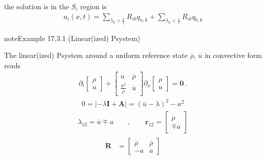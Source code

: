 \documentclass[letterpaper,10pt,english]{jupyterBook}
\begin{document}
\sphinxAtStartPar
the solution is in the \(S_i\) region is
\begin{equation*}
\begin{split}u_i(x,t) = \sum_{\lambda_k > \frac{x}{t}} R_{ik} q_{a,k} +  \sum_{\lambda_k < \frac{x}{t}} R_{ik} q_{b,k}\end{split}
\end{equation*}\label{ch/pde/hyperbolic:example-0}
\begin{sphinxadmonition}{note}{Example 17.3.1 (Linear(ized) P\sphinxhyphen{}system)}



\sphinxAtStartPar
The linear(ized) P\sphinxhyphen{}system around a uniform reference state \(\overline{\rho}\), \(\overline{u}\) in convective form reads
\begin{equation*}
\begin{split}
  \partial_t \begin{bmatrix} \rho \\ u \end{bmatrix} + \begin{bmatrix} \overline{u} & \overline{\rho} \\ \frac{a^2}{\overline{\rho}} & \overline{u} \end{bmatrix} \partial_x \begin{bmatrix} \rho \\ u \end{bmatrix} = \mathbf{0} \ .
\end{split}
\end{equation*}
\sphinxAtStartPar
{}
\begin{equation*}
\begin{split}0 = \left| -\lambda \mathbf{I} + \mathbf{A} \right| = (\overline{u}-\lambda)^2 - a^2\end{split}
\end{equation*}\begin{equation*}
\begin{split}\lambda_{12} = \overline{u} \mp a \qquad , \qquad \mathbf{r}_{12} = \begin{bmatrix} \overline{\rho} \\ \mp a \end{bmatrix} \end{split}
\end{equation*}\begin{equation*}
\begin{split}\begin{aligned}
  \mathbf{R} & = \begin{bmatrix} \overline{\rho} & \overline{\rho} \\ - a & a \end{bmatrix} \\

\end{aligned}
\end{split}
\end{equation*}
\end{sphinxadmonition}
\end{document}
